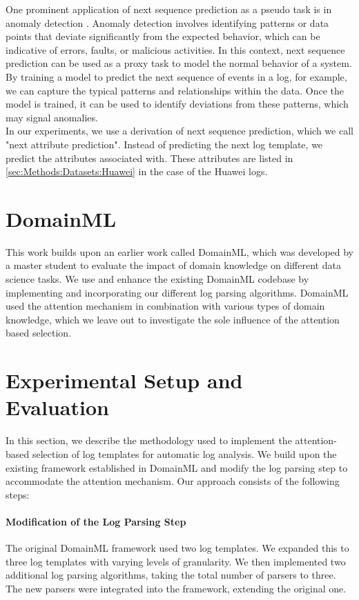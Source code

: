 One prominent application of next sequence prediction as a pseudo task is in anomaly detection \cite{nedelkoski2020selfsupervised}. Anomaly detection involves identifying patterns or data points that deviate significantly from the expected behavior, which can be indicative of errors, faults, or malicious activities. In this context, next sequence prediction can be used as a proxy task to model the normal behavior of a system. By training a model to predict the next sequence of events in a log, for example, we can capture the typical patterns and relationships within the data. Once the model is trained, it can be used to identify deviations from these patterns, which may signal anomalies.\\

In our experiments, we use a derivation of next sequence prediction, which we call "next attribute prediction". Instead of predicting the next log template, we predict the attributes associated with. These attributes are listed in \ref{sec:Methods:Datasets:Huawei} in the case of the Huawei logs.
\section{DomainML}
\label{sec:Methods:DomainML}
This work builds upon an earlier work called DomainML, which was developed by a master student to evaluate the impact of domain knowledge on different data science tasks. We use and enhance the existing DomainML codebase by implementing and incorporating our different log parsing algorithms. DomainML used the attention mechanism in combination with various types of domain knowledge, which we leave out to investigate the sole influence of the attention based selection. 

\section{Experimental Setup and Evaluation}
\label{sec:Methods:Experiments}

In this section, we describe the methodology used to implement the attention-based selection of log templates for automatic log analysis. We build upon the existing framework established in DomainML \cite{witterauf2021domainml} and modify the log parsing step to accommodate the attention mechanism. Our approach consists of the following steps:

\paragraph{Modification of the Log Parsing Step}
The original DomainML framework used two log templates. We expanded this to three log templates with varying levels of granularity. We then implemented two additional log parsing algorithms, taking the total number of parsers to three. The new parsers were integrated into the framework, extending the original one.

